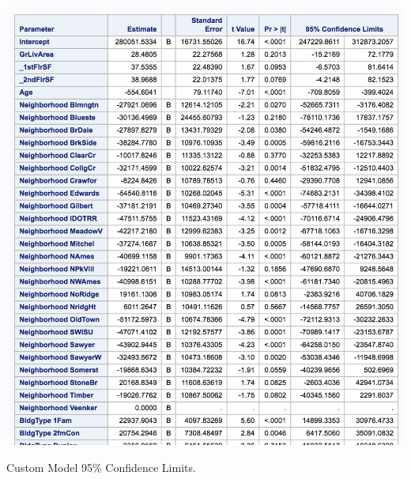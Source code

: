 \documentclass[11pt]{scrartcl} %
\begin{document}
\hrulefill
\begin{table}[H] %
	\centering %
	\includegraphics[scale=.3]{../graphics/A2CustCI}
	\caption{Custom Model 95\% Confidence Limits.}
	\label{tab:A2CustCI}
\end{table}
\hrulefill
\pagebreak
\end{document}
